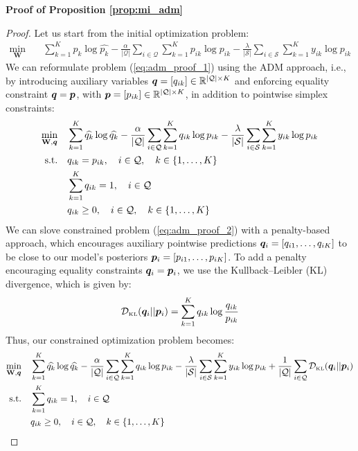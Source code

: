 \documentclass{article}
\begin{document}
    \textbf{Proof of Proposition \ref{prop:mi_adm}}
        \begin{proof}
            Let us start from the initial optimization problem:
            \begin{align}\label{eq:adm_proof_1}
	            \min_{\mathbf{W}}\quad & \sum_{k=1}^K \widehat{p_{k}} \log \widehat{p_{k}} - \frac{\alpha}{|\mathcal{Q}|} \sum_{i \in \mathcal{Q}} \sum_{k=1}^K p_{ik} \log p_{ik} - \frac{\lambda }{|\mathcal{S}|}\sum_{i \in \mathcal{S}}\sum_{k=1}^K y_{ik} \log p_{ik}
            \end{align}
            We can reformulate problem (\ref{eq:adm_proof_1}) using the ADM approach, i.e., by introducing auxiliary variables $\bm{q}=[q_{ik}] \in \mathbb{R}^{|\mathcal{Q}| \times K}$ and enforcing 
            equality constraint $\bm{q} = \bm{p}$, with $\bm{p}=[p_{ik}] \in \mathbb{R}^{|\mathcal{Q}| \times K}$, in addition to pointwise simplex constraints: 
	        \begin{align}\label{eq:adm_proof_2}
	            \min_{\mathbf{W}, \bm{q}}\quad & \sum_{k=1}^K \widehat{q_{k}} \log \widehat{q_{k}} - \frac{\alpha}{|\mathcal{Q}|} \sum_{i \in \mathcal{Q}} \sum_{k=1}^K q_{ik} \log p_{ik} - \frac{\lambda }{|\mathcal{S}|}\sum_{i \in \mathcal{S}}\sum_{k=1}^K y_{ik} \log p_{ik} \nonumber \\
	            \text{s.t.}\quad & q_{ik}=p_{ik}, \quad i \in \mathcal{Q}, \quad k \in \{1, \dots, K\} \nonumber \\ 
	            & \sum_{k=1}^K q_{ik}=1, \quad i \in \mathcal{Q} \nonumber \\
	            & q_{ik} \geq 0, \quad i \in \mathcal{Q}, \quad k \in \{1,\dots,K\}
	         \end{align}
We can slove constrained problem (\ref{eq:adm_proof_2}) with a penalty-based approach, which encourages auxiliary pointwise predictions $\bm{q}_{i}=[q_{i1}, \dots, q_{iK}]$ to be close to our model's posteriors $\bm{p}_{i}=[p_{i1}, \dots, p_{iK}]$. To add a penalty encouraging equality constraints $\bm{q}_i = \bm{p}_i$, we use the Kullback–Leibler (KL) divergence, which is given by:
	         \[\mathcal{D}_{\mbox{\tiny KL}}(\bm{q}_i||\bm{p}_i) = \sum_{k=1}^K q_{ik} \log \frac{q_{ik}}{p_{ik}}\]
	         Thus, our constrained optimization problem becomes:
	         \begin{align}\label{eq:adm_proof_3}
	            \min_{\mathbf{W}, \bm{q}}\quad & \sum_{k=1}^K \widehat{q_{k}} \log \widehat{q_{k}} - \frac{\alpha}{|\mathcal{Q}|} \sum_{i \in \mathcal{Q}} \sum_{k=1}^K q_{ik} \log p_{ik} - \frac{\lambda }{|\mathcal{S}|}\sum_{i \in \mathcal{S}}\sum_{k=1}^K y_{ik} \log p_{ik} + \frac{1}{|\mathcal{Q}|}\sum_{i \in \mathcal{Q}} \mathcal{D}_{\mbox{\tiny KL}}(\bm{q}_i||\bm{p}_i) \nonumber \\
	            \text{s.t.}\quad & \sum_{k=1}^K q_{ik}=1, \quad i \in \mathcal{Q} \nonumber \\
	            & q_{ik} \geq 0, \quad i \in \mathcal{Q}, \quad k \in \{1,\dots,K\}
	         \end{align}
        \end{proof}
        
\end{document}
